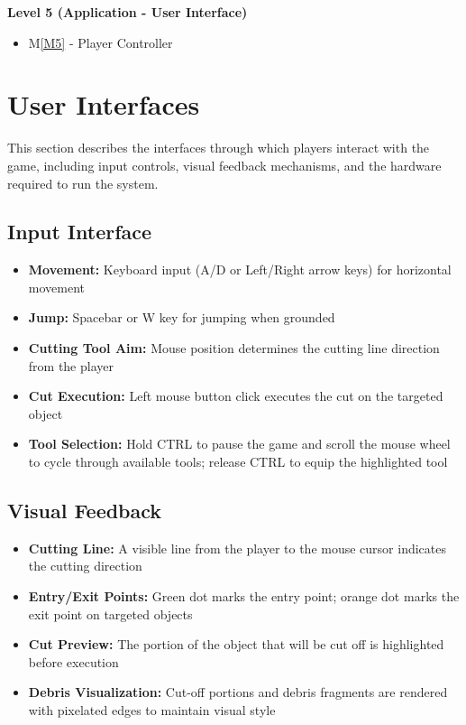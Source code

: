 \documentclass[12pt, titlepage]{article}
\newcommand{\mref}[1]{M\ref{#1}}
\begin{document}
\noindent
\textbf{Level 5 (Application - User Interface)}\\
\begin{itemize}
\item \mref{M5} - Player Controller
\end{itemize}


\section{User Interfaces}\label{SecUI}

This section describes the interfaces through which players interact with the game,
including input controls, visual feedback mechanisms, and the hardware required to
run the system.

\subsection{Input Interface}

\begin{itemize}
\item \textbf{Movement:} Keyboard input (A/D or Left/Right arrow keys) for horizontal movement
\item \textbf{Jump:} Spacebar or W key for jumping when grounded
\item \textbf{Cutting Tool Aim:} Mouse position determines the cutting line direction from the player
\item \textbf{Cut Execution:} Left mouse button click executes the cut on the targeted object
\item \textbf{Tool Selection:} Hold CTRL to pause the game and scroll the mouse wheel to cycle through available tools; release CTRL to equip the highlighted tool
\end{itemize}

\subsection{Visual Feedback}

\begin{itemize}
\item \textbf{Cutting Line:} A visible line from the player to the mouse cursor indicates the cutting direction
\item \textbf{Entry/Exit Points:} Green dot marks the entry point; orange dot marks the exit point on targeted objects
\item \textbf{Cut Preview:} The portion of the object that will be cut off is highlighted before execution
\item \textbf{Debris Visualization:} Cut-off portions and debris fragments are rendered with pixelated edges to maintain visual style
\end{itemize}
\end{document}
